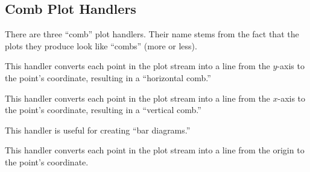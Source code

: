 \subsection{Comb Plot Handlers}

There are three ``comb'' plot handlers. Their name stems from the fact
that the plots they produce look like ``combs'' (more or less).

\begin{command}{\pgfplothandlerxcomb}
  This handler converts each point in the plot stream into a line from
  the $y$-axis to the point's coordinate, resulting in a ``horizontal
  comb.''

  
\begin{codeexample}[]
\end{codeexample}
\end{command}


\begin{command}{\pgfplothandlerycomb}
  This handler converts each point in the plot stream into a line from
  the $x$-axis to the point's coordinate, resulting in a ``vertical
  comb.''
  
  This handler is useful for creating ``bar diagrams.''
\begin{codeexample}[]
\end{codeexample}
\end{command}

\begin{command}{\pgfplothandlerpolarcomb}
  This handler converts each point in the plot stream into a line from
  the origin to the point's coordinate.
  
\begin{codeexample}[]
\end{codeexample}
\end{command}

